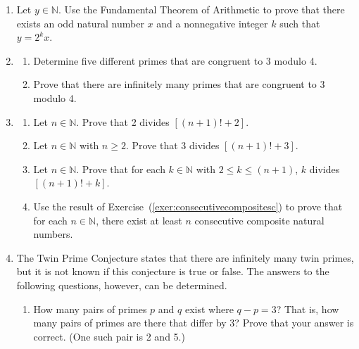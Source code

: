 \begin{enumerate}
\item Let $y \in \mathbb{N}$.  Use the Fundamental Theorem of Arithmetic to prove that there exists an odd natural number $x$ and a nonnegative integer $k$ such that \linebreak 
$y = 2^k x$. 
\label{exer:fundtheoremcons}

\item 
\label{exer:sec82-primescong3}%
\begin{enumerate} \item Determine five different primes that are congruent to  3  modulo  4.

  \item Prove that there are infinitely many primes that are congruent to  3  modulo  4.
\end{enumerate}

\item \label{exer:consecutivecomposites} \begin{enumerate} \item Let  $n \in \mathbb{N}$.  Prove that  2 divides $\left[ {\left( {n + 1} \right)!  + 2} \right]$.

  \item Let  $n \in \mathbb{N}$ with  $n \geq 2$.  Prove that  
        3 divides $\left[ {\left( {n + 1} \right)!  + 3} \right]$. 

  \item Let  $n \in \mathbb{N}$.  Prove that for each  $k \in \mathbb{N}$ with  
        $2 \leq k \leq \left( {n + 1} \right)$,  $k$ divides  
        $\left[ {\left( {n + 1} \right)!  + k} \right]$.                  
  \label{exer:consecutivecompositesc}

  \item Use the result of Exercise~(\ref{exer:consecutivecompositesc}) to prove that for each          $n \in \mathbb{N}$, there exist at least  $n$  consecutive composite natural numbers.
\end{enumerate}

\item The Twin Prime Conjecture states that there are infinitely many twin primes, but it is not known if this conjecture is true or false.  The answers to the following questions, however, can be determined.

\begin{enumerate}
\item How many pairs of primes  $p$ and $q$ exist where  $q - p = 3$?  That is, how many pairs of primes are there that differ by 3?  Prove that your answer is correct.  (One such pair is 2 and 5.)


\end{enumerate}
\end{enumerate}
